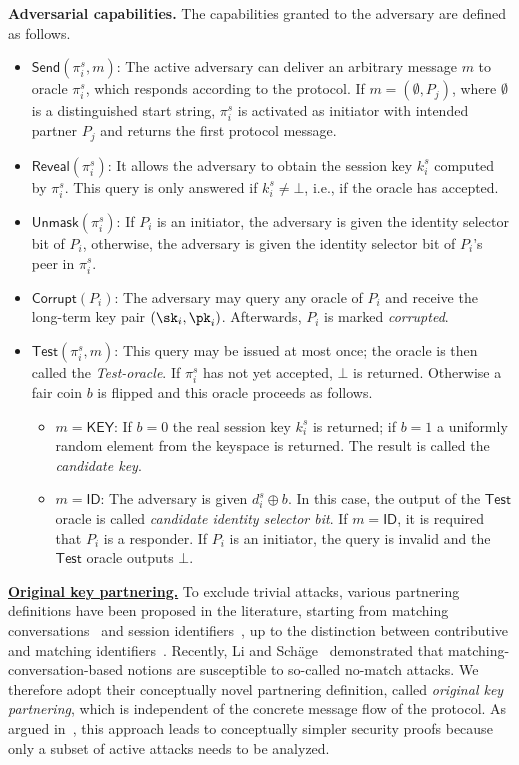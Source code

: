 \documentclass[runningheads]{llncs}
\begin{document}
\smallskip\noindent\textbf{Adversarial capabilities.} The capabilities granted to the adversary are defined as follows.
\begin{itemize}
\item $\textsf{Send}(\pi_i^s, m)$: The active adversary can deliver an arbitrary message $m$ to oracle $\pi_i^s$, which responds according to the protocol. If $m = (\emptyset, P_j)$, where $\emptyset$ is a distinguished start string, $\pi_i^s$ is activated as initiator with intended partner $P_j$ and returns the first protocol message.
\item $\textsf{Reveal}(\pi_i^s)$: It allows the adversary to obtain the session key $k_i^s$ computed by $\pi_i^s$. This query is only answered if $k_i^s \neq \bot$, i.e., if the oracle has accepted.
\item $\textsf{Unmask}(\pi_i^s)$: If $P_i$ is an initiator, the adversary is given the identity selector bit of $P_i$, otherwise, the adversary is given the identity selector bit of $P_i$'s peer in $\pi_i^s$.
\item $\textsf{Corrupt}(P_i)$: The adversary may query any oracle of $P_i$ and receive the long-term key pair $(\sk_i, \pk_i)$. Afterwards, $P_i$ is marked \textit{corrupted}.
\item $\textsf{Test}(\pi_i^s,m)$: This query may be issued at most once; the oracle is then called the \textit{Test-oracle}. If $\pi_i^s$ has not yet accepted, $\bot$ is returned. Otherwise a fair coin $b$ is flipped and this oracle proceeds as follows.
\begin{itemize}
    \item $m = \mathsf{KEY}$: If $b = 0$ the real session key $k_i^s$ is returned; if $b = 1$ a uniformly random element from the keyspace is returned. The result is called the \textit{candidate key}.
    \item $m = \mathsf{ID}$: The adversary is given $d_{i}^{s} \oplus b$. In this case, the output of the $\mathsf{Test}$ oracle is called {\it candidate identity selector bit}.
    If $m = \mathsf{ID}$, it is required that $P_{i}$ is a responder. If $P_{i}$ is an initiator, the query is invalid and the $\mathsf{Test}$ oracle outputs $\bot$.
\end{itemize}

\end{itemize}

\smallskip\noindent\uline{\textbf{Original key partnering.}}
To exclude trivial attacks, various partnering definitions have been proposed in the literature, starting from matching conversations~\cite{C:BelRog93} and session identifiers~\cite{EC:CanKra01}, up to the distinction between contributive and matching identifiers~\cite{CCS:FisGun14}. Recently, Li and Sch{\"a}ge~\cite{CCS:LiSch17} demonstrated that matching-conversation-based notions are susceptible to so-called no-match attacks.
We therefore adopt their conceptually novel partnering definition, called \textit{original key partnering}, which is independent of the concrete message flow of the protocol. As argued in~\cite{CCS:LiSch17}, this approach leads to conceptually simpler security proofs because only a subset of active attacks needs to be analyzed.
\end{document}
